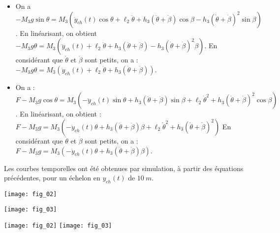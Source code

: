 \ifprof
\begin{corrige}
\begin{itemize}
\item On a 
$ -M_3 g \sin \theta  = 
 M_3\left(\ddot{y}_{ch}(t) \cos \theta +\ell_2\ddot{\theta} +h_3\left(\ddot{\theta}+\ddot{\beta}\right)\cos \beta 
-h_3\left(\dot{\theta}+\dot{\beta}\right)^2\sin\beta \right)$. En linéarisant, on obtient 
$ -M_3 g \theta  = 
 M_3\left(\ddot{y}_{ch}(t) +\ell_2\ddot{\theta} +h_3\left(\ddot{\theta}+\ddot{\beta}\right) 
-h_3\left(\dot{\theta}+\dot{\beta}\right)^2\beta \right)$. En considérant que $\dot{\theta}$ et $\dot{\beta}$ sont petits, on a : 
$ -M_3 g \theta  = 
 M_3\left(\ddot{y}_{ch}(t) +\ell_2\ddot{\theta} +h_3\left(\ddot{\theta}+\ddot{\beta}\right)  \right)$.
\item  On a : $F-M_3 g \cos \theta  = 
 M_3\left(- \ddot{y}_{ch}(t) \sin \theta +h_3\left(\ddot{\theta}+\ddot{\beta}\right) \sin\beta
+   
\ell_2\dot{\theta}^2   +h_3\left(\dot{\theta}+\dot{\beta}\right)^2\cos \beta \right) $. En linéarisant, on obtient :
$F-M_3 g  = 
 M_3\left(- \ddot{y}_{ch}(t) \theta +h_3\left(\ddot{\theta}+\ddot{\beta}\right) \beta
+   
\ell_2\dot{\theta}^2   +h_3\left(\dot{\theta}+\dot{\beta}\right)^2 \right) $
En considérant que $\dot{\theta}$ et $\dot{\beta}$ sont petits, on a : 
$F-M_3 g  = 
 M_3\left(- \ddot{y}_{ch}(t) \theta +h_3\left(\ddot{\theta}+\ddot{\beta}\right) \beta
 \right) $.
 \end{itemize}
\end{corrige}
\else
\fi


Les courbes temporelles ont été obtenues par simulation, à partir des équations précédentes, pour un
échelon en $y_{ch}(t)$ de $\SI{10}{m}$. 

\ifprof
\begin{multicols}{2}
\begin{center}
\texttt{[image: fig\_02]}
\end{center}

\begin{center}
\texttt{[image: fig\_03]}
\end{center}
\end{multicols}
\else
\begin{marginfigure}[-7cm]
\texttt{[image: fig\_02]}
\texttt{[image: fig\_03]}
\end{marginfigure}

